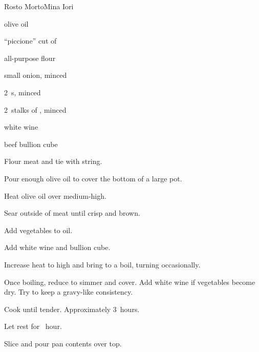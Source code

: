 \begin{recipe}{Rosto Morto}{Mina Iori}{}

\begin{ingredients}
\item olive oil
\item \kgr{1\half} ``piccione'' cut of 
\item all-purpose flour
\item small onion, minced
\item 2~s, minced
\item 2~stalks of , minced
\item white wine
\item beef bullion cube
\end{ingredients}

\begin{directions}
\item Flour meat and tie with string.
\item Pour enough olive oil to cover the bottom of a large pot.
\item Heat olive oil over medium-high.
\item Sear outside of meat until crisp and brown.
\item Add vegetables to oil.
\item Add white wine and bullion cube.
\item Increase heat to high and bring to a boil, turning occasionally.
\item Once boiling, reduce to simmer and cover. Add white wine if vegetables become dry. Try to keep a gravy-like consistency.
\item Cook until tender. Approximately 3~hours.
\item Let rest for \half~hour.
\item Slice and pour pan contents over top.
\end{directions}

\end{recipe}
